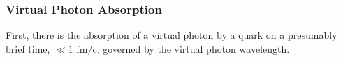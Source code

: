\subsubsection{Virtual Photon Absorption}
\label{sssec::virtual_photon_absorption}
    First, there is the absorption of a virtual photon by a quark on a presumably brief time, $\ll 1 \text{ fm}/\text{c}$, governed by the virtual photon wavelength.
